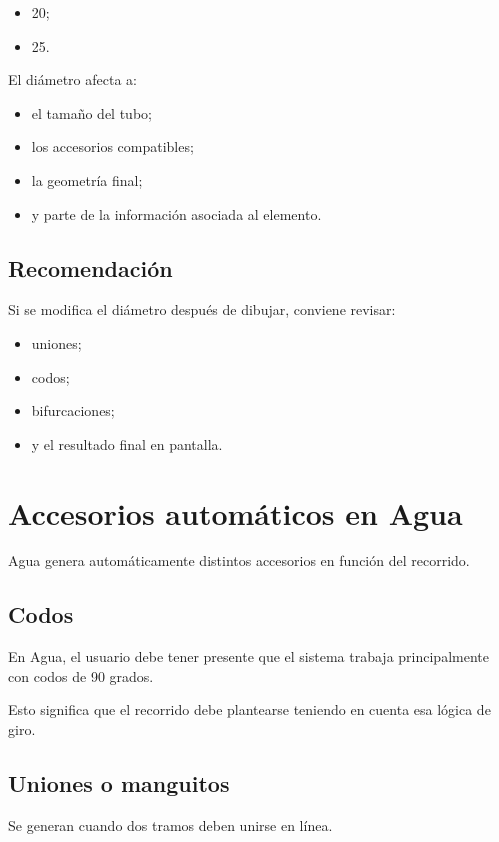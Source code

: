 \documentclass[12pt,a4paper]{article}
\begin{document}
\begin{itemize}
\item 20;
\item 25.
\end{itemize}

El diámetro afecta a:

\begin{itemize}
\item el tamaño del tubo;
\item los accesorios compatibles;
\item la geometría final;
\item y parte de la información asociada al elemento.
\end{itemize}

\subsection{Recomendación}

Si se modifica el diámetro después de dibujar, conviene revisar:

\begin{itemize}
\item uniones;
\item codos;
\item bifurcaciones;
\item y el resultado final en pantalla.
\end{itemize}

\section{Accesorios automáticos en Agua}

Agua genera automáticamente distintos accesorios en función del recorrido.

\subsection{Codos}

En Agua, el usuario debe tener presente que el sistema trabaja principalmente con codos de 90 grados.

Esto significa que el recorrido debe plantearse teniendo en cuenta esa lógica de giro.

\subsection{Uniones o manguitos}

Se generan cuando dos tramos deben unirse en línea.
\end{document}
